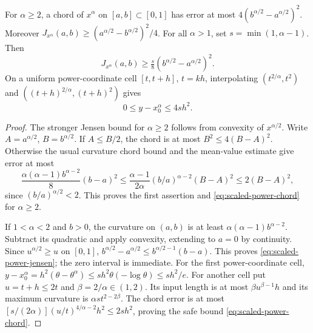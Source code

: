 \begin{lemma}\label{lem:power-chords}
For $\alpha\ge2$, a chord of $x^\alpha$ on $[a,b]\subset[0,1]$
has error at most $4(b^{\alpha/2}-a^{\alpha/2})^2$.
Moreover $J_{x^\alpha}(a,b)\ge(a^{\alpha/2}-b^{\alpha/2})^2/4$.
For all $\alpha>1$, set $s=\min(1,\alpha-1)$. Then
\begin{equation}\label{eq:scaled-power-jensen}
 J_{x^\alpha}(a,b)\ge\tfrac{s}{8}
                         (b^{\alpha/2}-a^{\alpha/2})^2.
\end{equation}
On a uniform power-coordinate cell $[t,t+h]$, $t=kh$, interpolating
$(t^{2/\alpha},t^2)$ and $((t+h)^{2/\alpha},(t+h)^2)$ gives
\begin{equation}\label{eq:scaled-power-chord}
 0\le y-x_0^\alpha\le4s h^2.
\end{equation}
\end{lemma}
\begin{proof}
The stronger Jensen bound for $\alpha\ge2$ follows from convexity
of $x^{\alpha/2}$. Write $A=a^{\alpha/2}$, $B=b^{\alpha/2}$.
If $A\le B/2$, the chord is at most $B^2\le4(B-A)^2$.
Otherwise the usual curvature chord bound and the mean-value estimate
give error at most
\[
 \frac{\alpha(\alpha-1)b^{\alpha-2}}8(b-a)^2
 \le\frac{\alpha-1}{2\alpha}(b/a)^{\alpha-2}(B-A)^2
 \le2(B-A)^2,
\]
since $(b/a)^{\alpha/2}<2$. This proves the first assertion and
\eqref{eq:scaled-power-chord} for $\alpha\ge2$.

If $1<\alpha<2$ and $b>0$, the curvature on $(a,b)$ is at least
$\alpha(\alpha-1)b^{\alpha-2}$. Subtract its quadratic and apply
convexity, extending to $a=0$ by continuity. Since
$u^{\alpha/2}\ge u$ on $[0,1]$,
$b^{\alpha/2}-a^{\alpha/2}\le b^{\alpha/2-1}(b-a)$.
This proves \eqref{eq:scaled-power-jensen}; the zero interval is
immediate. For the first power-coordinate cell,
$y-x_0^\alpha=h^2(\theta-\theta^\alpha)
\le s h^2\theta(-\log\theta)\le s h^2/e$.
For another cell put $u=t+h\le2t$ and $\beta=2/\alpha\in(1,2)$.
Its input length is at most $\beta u^{\beta-1}h$ and its maximum
curvature is $\alpha s t^{2-2\beta}$. The chord error is at most
$[s/(2\alpha)](u/t)^{4/\alpha-2}h^2\le2s h^2$, proving the
safe bound \eqref{eq:scaled-power-chord}.
\end{proof}

